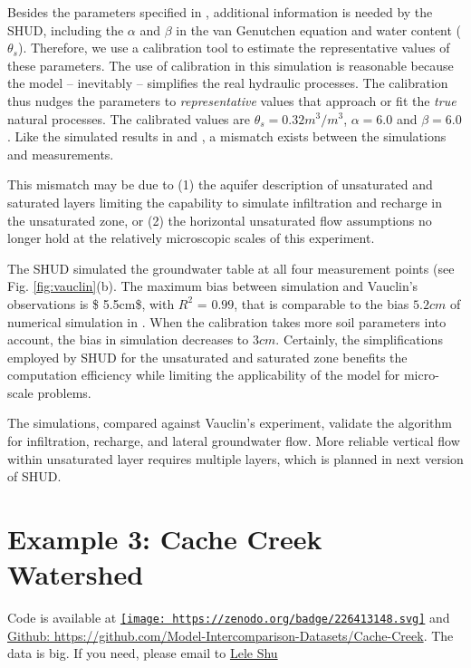 \documentclass[]{scrbook}
\begin{document}
Besides the parameters specified in \citep{Vauclin1979}, additional
information is needed by the SHUD, including the \(\alpha\) and
\(\beta\) in the van Genutchen equation and water content
(\(\theta _s\)). Therefore, we use a calibration tool to estimate the
representative values of these parameters. The use of calibration in
this simulation is reasonable because the model -- inevitably --
simplifies the real hydraulic processes. The calibration thus nudges the
parameters to \emph{representative} values that approach or fit the
\emph{true} natural processes. The calibrated values are
\(\theta _s = 0.32 m^3/m^3\), \(\alpha = 6.0\) and \(\beta = 6.0\). Like
the simulated results in \citep{Vauclin1979} and \citep{Shen2010}, a
mismatch exists between the simulations and measurements.

This mismatch may be due to (1) the aquifer description of unsaturated
and saturated layers limiting the capability to simulate infiltration
and recharge in the unsaturated zone, or (2) the horizontal unsaturated
flow assumptions no longer hold at the relatively microscopic scales of
this experiment.

The SHUD simulated the groundwater table at all four measurement points
(see Fig. \ref{fig:vauclin}(b). The maximum bias between simulation and
Vauclin's observations is \$ 5.5cm\$, with \(R^2\) = \(0.99\), that is
comparable to the bias \(5.2 cm\) of numerical simulation in
\citep{Vauclin1979}. When the calibration takes more soil parameters
into account, the bias in simulation decreases to \(3 cm\). Certainly,
the simplifications employed by SHUD for the unsaturated and saturated
zone benefits the computation efficiency while limiting the
applicability of the model for micro-scale problems.

The simulations, compared against Vauclin's experiment, validate the
algorithm for infiltration, recharge, and lateral groundwater flow. More
reliable vertical flow within unsaturated layer requires multiple
layers, which is planned in next version of SHUD.

\section{Example 3: Cache Creek
Watershed}\label{example-3-cache-creek-watershed}

Code is available at
\href{https://zenodo.org/badge/latestdoi/226413148}{\texttt{[image: https://zenodo.org/badge/226413148.svg]}}
and
\href{https://github.com/Model-Intercomparison-Datasets/Cache-Creek}{Github:
https://github.com/Model-Intercomparison-Datasets/Cache-Creek}. The data
is big. If you need, please email to
\href{mailto:lele.shu@gmail.com}{Lele Shu}
\end{document}
